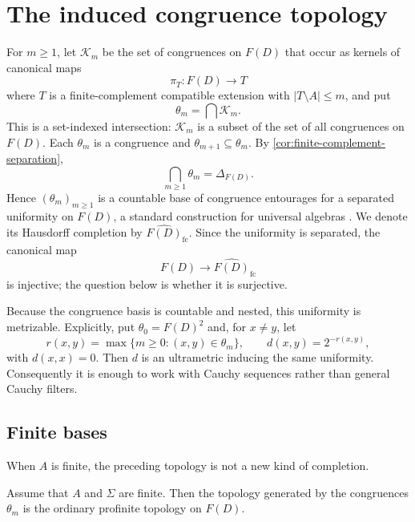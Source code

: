 \section{The induced congruence topology}\label{sec:completion}

For $m\ge1$, let $\mathcal K_m$ be the set of congruences on $F(D)$ that occur
as kernels of canonical maps
\[
 \pi_T:F(D)\longrightarrow T
\]
where $T$ is a finite-complement compatible extension with
$|T\setminus A|\le m$, and put
\[
 \theta_m=\bigcap\mathcal K_m.
\]
This is a set-indexed intersection: $\mathcal K_m$ is a subset of the set of
all congruences on $F(D)$.  Each $\theta_m$ is a congruence and
$\theta_{m+1}\subseteq\theta_m$.  By
\cref{cor:finite-complement-separation},
\[
 \bigcap_{m\ge1}\theta_m=\Delta_{F(D)}.
\]
Hence $(\theta_m)_{m\ge1}$ is a countable base of congruence entourages for a
separated uniformity on $F(D)$, a standard construction for universal algebras
\cite{BulmanFleming1971}.  We denote its Hausdorff completion by
$\widehat{F(D)}_{\mathrm{fc}}$.  Since the uniformity is separated, the
canonical map
\[
 F(D)\longrightarrow\widehat{F(D)}_{\mathrm{fc}}
\]
is injective; the question below is whether it is surjective.

Because the congruence basis is countable and nested, this uniformity is
metrizable.  Explicitly, put $\theta_0=F(D)^2$ and, for $x\ne y$, let
\[
 r(x,y)=\max\{m\ge0:(x,y)\in\theta_m\},
 \qquad d(x,y)=2^{-r(x,y)},
\]
with $d(x,x)=0$.  Then $d$ is an ultrametric inducing the same uniformity.
Consequently it is enough to work with Cauchy sequences rather than general
Cauchy filters.

\subsection{Finite bases}

When $A$ is finite, the preceding topology is not a new kind of completion.

\begin{proposition}
\label{prop:finite-base-profinite}
Assume that $A$ and $\Sigma$ are finite.  Then the topology generated by the
congruences $\theta_m$ is the ordinary profinite topology on $F(D)$.
\end{proposition}

